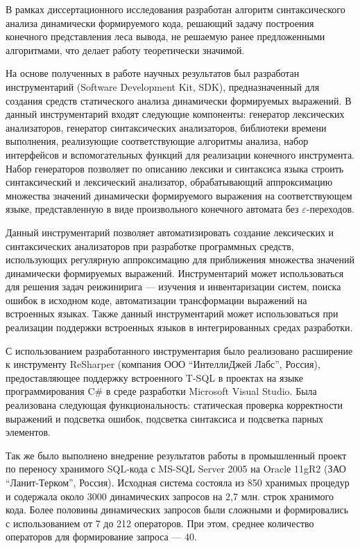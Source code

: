 В рамках диссертационного исследования разработан алгоритм синтаксического анализа динамически формируемого кода, решающий задачу построения конечного представления леса вывода, не решаемую ранее предложенными алгоритмами, что делает работу теоретически значимой.

На основе полученных в работе научных результатов был разработан инструментарий (Software Development Kit, SDK), предназначенный для создания средств статического анализа динамически формируемых выражений. В данный инструментарий входят следующие компоненты: генератор лексических анализаторов, генератор синтаксических анализаторов, библиотеки времени выполнения, реализующие соответствующие алгоритмы анализа, набор интерфейсов и вспомогательных функций для реализации конечного инструмента. Набор генераторов позволяет по описанию лексики и синтаксиса языка строить синтаксический и лексический анализатор, обрабатывающий аппроксимацию множества значений динамически формируемого выражения на соответствующем языке, представленную в виде произвольного конечного автомата без $\varepsilon$-переходов.

Данный инструментарий позволяет автоматизировать создание лексических и синтаксических анализаторов при разработке программных средств, использующих регулярную аппроксимацию для приближения множества значений динамически формируемых выражений. Инструментарий может использоваться  для решения задач реижинирига --- изучения и инвентаризации систем, поиска ошибок в исходном коде, автоматизации трансформации выражений на встроенных языках. Также данный инструментарий может использоваться при реализации поддержки встроенных языков в интегрированных средах разработки.

С использованием разработанного инструментария было реализовано расширение к инструменту ReSharper (компания ООО ``ИнтеллиДжей Лабс'', Россия), предоставляющее поддержку встроенного T-SQL в проектах на языке программирования C\# в среде разработки Microsoft Visual Studio. Была реализована следующая функциональность: статическая проверка корректности выражений и подсветка ошибок, подсветка синтаксиса и подсветка парных элементов.

Так же было выполнено внедрение результатов работы в промышленный проект по переносу хранимого SQL-кода с MS-SQL Server 2005 на Oraclе 11gR2 (ЗАО ``Ланит-Терком'', Россия). Исходная система состояла из 850 хранимых процедур и содержала около 3000 динамических запросов на 2,7 млн. строк хранимого кода. Более половины динамических запросов были сложными и формировались с использованием от 7 до 212 операторов. При этом, среднее количество операторов для формирование запроса ---  40.

